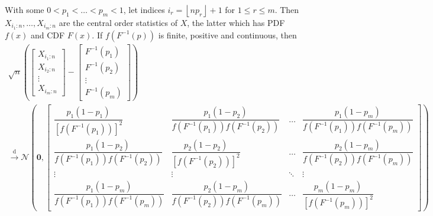 \documentclass[11pt]{report} %
\begin{document}
\begin{theorem}
With some $0 < p_{1} < \dots < p_{m} < 1$, let indices $i_{r} = \left\lfloor np _{r}\right\rfloor + 1$ for $1 \leq r \leq m$. Then $X_{i_{1}:n}, \dots,  X_{i_{m}:n}$ are the central order statistics of $X$, the latter which has PDF $f\left(x\right)$ and CDF $F\left(x\right)$. If $f\left(F^{-1}\left(p\right)\right)$ is finite, positive and continuous, then
\begin{multline}
\sqrt{n}\left(\begin{bmatrix}X_{i_{1}:n}\\
X_{i_{2}:n}\\
\vdots\\
X_{i_{m}:n}
\end{bmatrix}-\begin{bmatrix}F^{-1}\left(p_{1}\right)\\
F^{-1}\left(p_{2}\right)\\
\vdots\\
F^{-1}\left(p_{m}\right)
\end{bmatrix}\right) \\
\overset{\mathrm{d}}{\to}
\mathcal{N}\left(\mathbf{0},\begin{bmatrix}\dfrac{p_{1}\left(1-p_{1}\right)}{\left[f\left(F^{-1}\left(p_{1}\right)\right)\right]^{2}} & \dfrac{p_{1}\left(1-p_{2}\right)}{f\left(F^{-1}\left(p_{1}\right)\right)f\left(F^{-1}\left(p_{2}\right)\right)} & \dots & \dfrac{p_{1}\left(1-p_{m}\right)}{f\left(F^{-1}\left(p_{1}\right)\right)f\left(F^{-1}\left(p_{m}\right)\right)}\\
\dfrac{p_{1}\left(1-p_{2}\right)}{f\left(F^{-1}\left(p_{1}\right)\right)f\left(F^{-1}\left(p_{2}\right)\right)} & \dfrac{p_{2}\left(1-p_{2}\right)}{\left[f\left(F^{-1}\left(p_{2}\right)\right)\right]^{2}} & \dots & \dfrac{p_{2}\left(1-p_{m}\right)}{f\left(F^{-1}\left(p_{2}\right)\right)f\left(F^{-1}\left(p_{m}\right)\right)}\\
\vdots & \vdots & \ddots & \vdots\\
\dfrac{p_{1}\left(1-p_{m}\right)}{f\left(F^{-1}\left(p_{1}\right)\right)f\left(F^{-1}\left(p_{m}\right)\right)} & \dfrac{p_{2}\left(1-p_{m}\right)}{f\left(F^{-1}\left(p_{2}\right)\right)f\left(F^{-1}\left(p_{m}\right)\right)} & \dots & \dfrac{p_{m}\left(1-p_{m}\right)}{\left[f\left(F^{-1}\left(p_{m}\right)\right)\right]^{2}}
\end{bmatrix}\right)
\end{multline}
\end{theorem}
\end{document}
